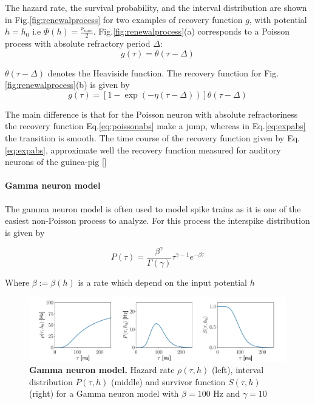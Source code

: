 \documentclass[12pt,twoside]{report}
\begin{document}
The hazard rate, the survival probability, and the interval distribution are shown in Fig.\ref{fig:renewalprocess} for two examples of recovery function $g$, with potential $h=h_0$ i.e $\Phi(h)=\frac{\nu_{max}}{2}$. Fig.\ref{fig:renewalprocess}(a) corresponds to a Poisson process with absolute refractory period $\Delta$: 
\begin{equation}
\label{eq:poissonabs}
g(\tau)=\theta(\tau-\Delta)
\end{equation}

$\theta(\tau-\Delta)$ denotes the Heaviside function. The recovery function for Fig.\ref{fig:renewalprocess}(b) is given by
\begin{equation}
\label{eq:expabs}
g(\tau)=\left[1-\exp(-\eta(\tau-\Delta))\right]\theta(\tau-\Delta)
\end{equation}

The main difference is that for the Poisson neuron with absolute refractoriness the recovery function Eq.\eqref{eq:poissonabs} make a jump, whereas in Eq.\eqref{eq:expabs} the transition is smooth. The time course of the recovery function given by Eq.\eqref{eq:expabs}, approximate well the recovery function measured for auditory neurons  of the guinea-pig [\cite{Prij93}]



\paragraph{Gamma neuron model}


The gamma neuron model is often used to model spike trains as it is one of the easiest non-Poisson process to analyze. For this process the interspike distribution is given by

\begin{equation}
\label{eq:gamma}
P(\tau)=\frac{\beta^\gamma}{\Gamma(\gamma)}\tau^{\gamma-1}e^{-\beta\tau}
\end{equation}

Where $\beta:=\beta(h)$ is a rate which depend on the input potential $h$

\begin{figure}[h!]
	\includegraphics[width=\linewidth]{gamma.pdf}
	\caption{\textbf{Gamma neuron model.} Hazard rate $\rho(\tau,h)$ (left), interval distribution $P(\tau,h)$ (middle) and survivor function $S(\tau,h)$ (right) for a Gamma neuron model with $\beta=100$ Hz and $\gamma=10$ }
	\label{fig:gammaprocess}
\end{figure}
\end{document}
